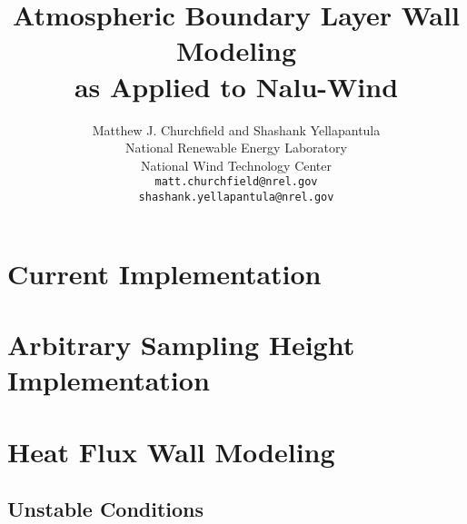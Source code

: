 \documentclass{article}
\begin{document}
\author{Matthew J. Churchfield and Shashank Yellapantula \\National Renewable Energy Laboratory\\National Wind Technology Center 
\\ {\tt matt.churchfield@nrel.gov}  
\\ {\tt shashank.yellapantula@nrel.gov}}
\title{Atmospheric Boundary Layer Wall Modeling \\as Applied to Nalu-Wind}
\maketitle






\tableofcontents
\newpage





\section{Current Implementation}

\section{Arbitrary Sampling Height Implementation}

\section{Heat Flux Wall Modeling}
\subsection{Unstable Conditions}
\end{document}
